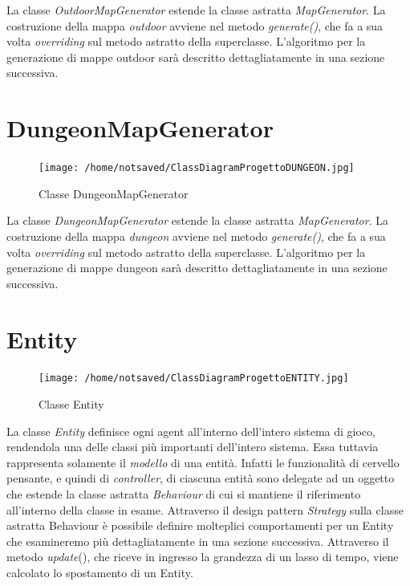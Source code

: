\documentclass[11pt]{book}
\begin{document}
La classe \emph{OutdoorMapGenerator} estende la classe astratta \emph{MapGenerator}. La costruzione della mappa \emph{outdoor} avviene nel metodo \emph{generate()}, che fa a sua volta \emph{overriding} sul metodo astratto della superclasse. L'algoritmo per la generazione di mappe outdoor sar\`a descritto dettagliatamente in una sezione successiva. 

\section{DungeonMapGenerator}

\begin{figure}[H]
\centering
\texttt{[image: /home/notsaved/ClassDiagramProgettoDUNGEON.jpg]}
\caption{Classe DungeonMapGenerator}
\label{classdungeonmap}
\end{figure}

La classe \emph{DungeonMapGenerator} estende la classe astratta \emph{MapGenerator}. La costruzione della mappa \emph{dungeon} avviene nel metodo \emph{generate()}, che fa a sua volta \emph{overriding} sul metodo astratto della superclasse. L'algoritmo per la generazione di mappe dungeon sar\`a descritto dettagliatamente in una sezione successiva. 

\section{Entity}

\begin{figure}[H]
\centering
\texttt{[image: /home/notsaved/ClassDiagramProgettoENTITY.jpg]}
\caption{Classe Entity}
\label{classentity}
\end{figure}

La classe \emph{Entity} definisce ogni agent all'interno dell'intero sistema di gioco, rendendola una delle classi pi\`u importanti dell'intero sistema. Essa tuttavia rappresenta solamente il \emph{modello} di una entit\`a. Infatti le funzionalit\`a di cervello pensante, e quindi di \emph{controller}, di ciascuna entit\`a sono delegate ad un oggetto che estende la classe astratta \emph{Behaviour} di cui si mantiene il riferimento all'interno della classe in esame. Attraverso il design pattern \emph{Strategy} sulla classe astratta Behaviour \`e possibile definire molteplici comportamenti per un Entity che esamineremo pi\`u dettagliatamente in una sezione successiva. Attraverso il metodo \emph{update}(), che riceve in ingresso la grandezza di un lasso di tempo, viene calcolato lo spostamento di un Entity.
\end{document}
